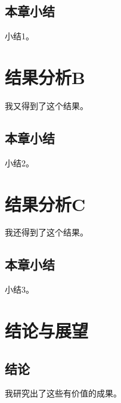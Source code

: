 \documentclass[a4paper]{article}
\begin{document}
    \subsection{本章小结}
    \begin{body}
        小结1。\par
    \end{body}
    \section{结果分析B}
    \begin{body}
        我又得到了这个结果。\par
    \end{body}
    \subsection{本章小结}
    \begin{body}
        小结2。\par
    \end{body}
    \section{结果分析C}
    \begin{body}
        我还得到了这个结果。\par
    \end{body}
    \subsection{本章小结}
    \begin{body}
        小结3。\par
    \end{body}
    \section{结论与展望}
    \subsection{结论}
    \begin{body}
        我研究出了这些有价值的成果。\par
    \end{body}
\end{document}

